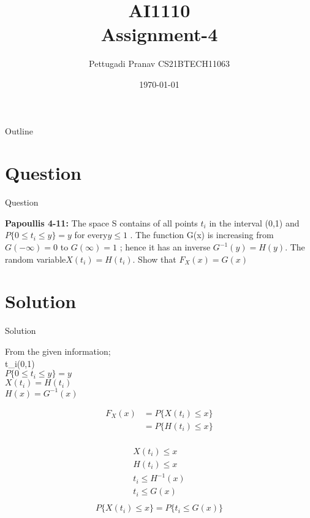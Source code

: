 \documentclass{beamer}
\title{AI1110 \\ Assignment-4}
\author{Pettugadi Pranav CS21BTECH11063}
\date{\today}
\begin{document}
\begin{frame}
    \titlepage 
\end{frame}
\logo{}


\begin{frame}{Outline}
    \tableofcontents
\end{frame}



\section{Question}
\begin{frame}{Question}
    \begin{block}{\textbf{Papoullis 4-11:} } 
       The space S contains of all points $t_i$ in the interval (0,1) and $P\{0 \le t_i \le y\}=y$ 
       for every$y \le 1$ . The function G(x) is increasing from $G(-\infty)=0$ to $G(\infty)=1$
; hence it has an inverse $G^{-1}(y) = H(y)$. The random variable$ X(t_i)= H(t_i)$. Show that $F_X(x)=G(x)$     \end{block}
     
\end{frame}



\section{Solution}
\begin{frame}{Solution}
  \begin{block}{}
      From the given information;\\ t_i(0,1)\\
       $P\{0\le t_i \le y\}=y$\\
        $X(t_i) =H(t_i)$ \\ $H(x) = G^{-1}(x)$\\
        \end{block}
        
        \begin{align}
            F_X(x) &= P\{X(t_i) \le x\}\\
                   &=  P\{H(t_i) \le x\}\\
        \end{align}
        
        \end{frame}
        
        \begin{frame}
        \begin{align}
            X(t_i) \le x\\
            H(t_i) \le x\\
            t_i \le H^{-1}(x)\\
            t_i \le G(x)\\
            \end{align}
            \begin{align}
            P\{X(t_i) \le x\} = P\{t_i \le G(x)\}\\
            \end{align}
            \end{frame}
            
\end{document}
